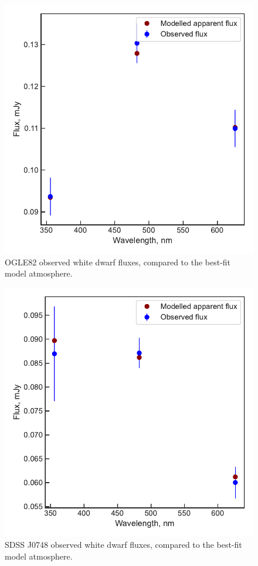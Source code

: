 \begin{figure}
    \centering
    \includegraphics[width=\textwidth]{figures/results/OGLE82/fluxplot.pdf}
    \caption{OGLE82 observed white dwarf fluxes, compared to the best-fit model atmosphere.}
    \label{fig:OGLE82 flux plot}
\end{figure}

\begin{figure}
    \centering
    \includegraphics[width=\textwidth]{figures/results/SDSS0748/fluxplot.pdf}
    \caption{SDSS J0748 observed white dwarf fluxes, compared to the best-fit model atmosphere.}
    \label{fig:SDSS0748 flux plot}
\end{figure}

